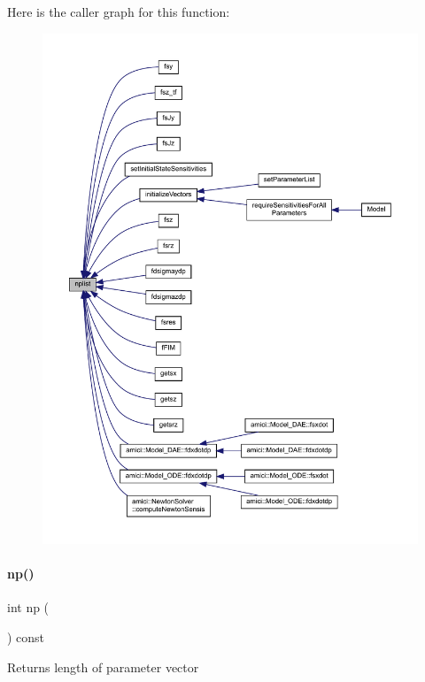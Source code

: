 Here is the caller graph for this function\+:
\nopagebreak
\begin{figure}[H]
\begin{center}
\leavevmode
\includegraphics[width=350pt]{classamici_1_1_model_a0f8e994055e37954d7746f3c1af27a5c_icgraph}
\end{center}
\end{figure}
\mbox{\label{classamici_1_1_model_ae296546c9fd4d7c4ad3b7000aa9e22ef}} 
\paragraph{\texorpdfstring{np()}{np()}}
{\footnotesize\ttfamily int np (\begin{DoxyParamCaption}{ }\end{DoxyParamCaption}) const}

\begin{DoxyReturn}{Returns}
length of parameter vector 
\end{DoxyReturn}


